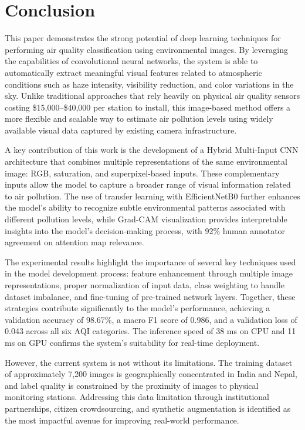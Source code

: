\documentclass[conference]{IEEEtran}
\begin{document}
\section{Conclusion}

This paper demonstrates the strong potential of deep learning techniques for
performing air quality classification using environmental images. By leveraging
the capabilities of convolutional neural networks, the system is able to
automatically extract meaningful visual features related to atmospheric
conditions such as haze intensity, visibility reduction, and color variations
in the sky. Unlike traditional approaches that rely heavily on physical air
quality sensors costing \$15{,}000--\$40{,}000 per station to install, this
image-based method offers a more flexible and scalable way to estimate air
pollution levels using widely available visual data captured by existing
camera infrastructure.

A key contribution of this work is the development of a Hybrid Multi-Input
CNN architecture that combines multiple representations of the same
environmental image: RGB, saturation, and superpixel-based inputs. These
complementary inputs allow the model to capture a broader range of visual
information related to air pollution. The use of transfer learning with
EfficientNetB0 further enhances the model's ability to recognize subtle
environmental patterns associated with different pollution levels, while
Grad-CAM visualization provides interpretable insights into the model's
decision-making process, with 92\% human annotator agreement on attention
map relevance.

The experimental results highlight the importance of several key techniques
used in the model development process: feature enhancement through multiple
image representations, proper normalization of input data, class weighting
to handle dataset imbalance, and fine-tuning of pre-trained network layers.
Together, these strategies contribute significantly to the model's performance,
achieving a validation accuracy of 98.67\%, a macro F1 score of 0.986, and
a validation loss of 0.043 across all six AQI categories. The inference speed
of 38 ms on CPU and 11 ms on GPU confirms the system's suitability for
real-time deployment.

However, the current system is not without its limitations. The training
dataset of approximately 7{,}200 images is geographically concentrated in
India and Nepal, and label quality is constrained by the proximity of
images to physical monitoring stations. Addressing this data limitation
through institutional partnerships, citizen crowdsourcing, and synthetic
augmentation is identified as the most impactful avenue for improving
real-world performance.
\end{document}
